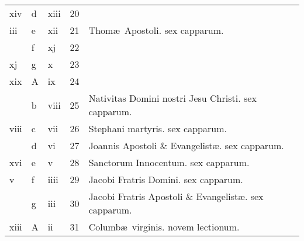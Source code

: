 \documentclass[11pt,openany]{book}
\begin{document}
\begin{center}
\begin{tabular}{l | l | l | r | l r}
\color{Red} xiv & d & \color{Red} xiii & 20 & & \color{Red} \\
\color{Red} iii & e & \color{Red} xii & 21 & \color{Red} Thom\ae \ Apostoli. \color{black} sex capparum. & \color{Red} \\
\color{Red}  & f & \color{Red} xj & 22 & & \color{Red} \\
\color{Red} xj & g & \color{Red} x & 23 & & \color{Red} \\
\color{Red} xix & \color{Red} A & \color{Red} ix & 24 & & \color{Red} \\
\color{Red}  & b & \color{Red} viii & 25 & \color{Red} Nativitas Domini nostri Jesu Christi. \color{black} sex capparum. & \color{Red} \\
\color{Red} viii & c & \color{Red} vii & 26 & \color{Red} Stephani martyris. \color{black} sex capparum. & \color{Red} \\
\color{Red}  & d & \color{Red} vi & 27 & \color{Red} Joannis Apostoli \& Evangelist\ae . \color{black} sex capparum. & \color{Red} \\
\color{Red} xvi & e & \color{Red} v & 28 & \color{Red} Sanctorum Innocentum. \color{black} sex capparum. & \color{Red} \\
\color{Red} v & f & \color{Red} iiii & 29 & Jacobi Fratris Domini. \color{Red} sex capparum. & \color{Red} \\
\color{Red}  & g & \color{Red} iii & 30 & Jacobi Fratris Apostoli \& Evangelist\ae . \color{Red} sex capparum. & \color{Red} \\
\color{Red} xiii & \color{Red} A & \color{Red} ii & 31 & Columb\ae \ virginis. \color{Red} novem lectionum. & \color{Red} \\
\end{tabular}
\end{center}


\end{document}
